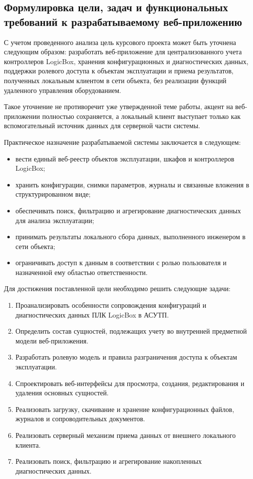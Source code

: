 \subsection{Формулировка цели, задач и функциональных требований к разрабатываемому веб-приложению}

С учетом проведенного анализа цель курсового проекта может быть уточнена
следующим образом: разработать веб-приложение для централизованного учета
контроллеров LogicBox, хранения конфигурационных и диагностических данных,
поддержки ролевого доступа к объектам эксплуатации и приема результатов,
полученных локальным клиентом в сети объекта, без реализации функций удаленного
управления оборудованием.

Такое уточнение не противоречит уже утвержденной теме работы, акцент на веб-приложении полностью
сохраняется, а локальный клиент выступает только как вспомогательный источник
данных для серверной части системы.

Практическое назначение разрабатываемой системы заключается в следующем:
\begin{itemize}
    \item вести единый веб-реестр объектов эксплуатации, шкафов и контроллеров LogicBox;
    \item хранить конфигурации, снимки параметров, журналы и связанные вложения в структурированном виде;
    \item обеспечивать поиск, фильтрацию и агрегирование диагностических данных для анализа эксплуатации;
    \item принимать результаты локального сбора данных, выполненного инженером в сети объекта;
    \item ограничивать доступ к данным в соответствии с ролью пользователя и назначенной ему областью ответственности.
\end{itemize}

Для достижения поставленной цели необходимо решить следующие задачи:
\begin{enumerate}
    \item Проанализировать особенности сопровождения конфигураций и диагностических данных ПЛК LogicBox в АСУТП.
    \item Определить состав сущностей, подлежащих учету во внутренней предметной модели веб-приложения.
    \item Разработать ролевую модель и правила разграничения доступа к объектам эксплуатации.
    \item Спроектировать веб-интерфейсы для просмотра, создания, редактирования и удаления основных сущностей.
    \item Реализовать загрузку, скачивание и хранение конфигурационных файлов, журналов и сопроводительных документов.
    \item Реализовать серверный механизм приема данных от внешнего локального клиента.
    \item Реализовать поиск, фильтрацию и агрегирование накопленных диагностических данных.
\end{enumerate}

